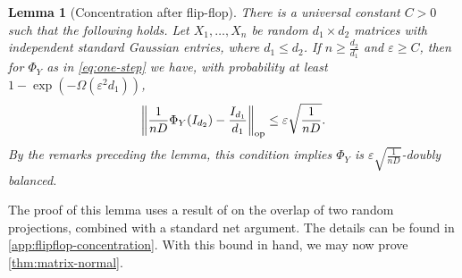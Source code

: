 \documentclass[aos]{imsart}
\newtheorem{lemma}[theorem]{Lemma}
\theoremstyle{definition}
\numberwithin{equation}{section}
\DeclareMathOperator{\op}{op}
\DeclarePairedDelimiter{\norm}{\lVert}{\rVert}
\newcommand{\eps}{\varepsilon}
\begin{document}
\begin{lemma}[Concentration after flip-flop]\label{lem:flipflop-concentration}
There is a universal constant $C>0$ such that the following holds.
Let $X_1,\dots,X_n$ be random $d_1 \times d_2$ matrices with independent standard Gaussian entries, where $d_1 \leq d_2$.
If $n \geq \frac{d_2}{d_1}$ and $\eps\geq C$, then for $\Phi_Y$ as in \cref{eq:one-step} we have, with probability at least $1 - \exp(- \Omega( \eps^2 d_{1}))$,
\begin{align*}
  \norm*{\frac1{n D} \Phi_Y(I_{d_2}) - \frac{I_{d_1}}{d_1}}_{\op} \leq \eps \sqrt{\frac1{nD}}.
\end{align*}
By the remarks preceding the lemma, this condition implies $\Phi_Y$ is $\eps \sqrt{\frac1{nD}}$-doubly balanced.
\end{lemma}

The proof of this lemma uses a result of \cite{hayden2006aspects} on the overlap of two random projections, combined with a standard net argument.
The details can be found in \cref{app:flipflop-concentration}.
With this bound in hand, we may now prove \cref{thm:matrix-normal}.
\end{document}

